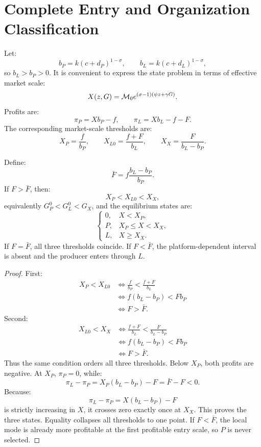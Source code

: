 \section{Complete Entry and Organization Classification}

Let:
\[
b_P=k(c+d_P)^{1-\sigma},
\qquad
b_L=k(c+d_L)^{1-\sigma},
\]
so \(b_L>b_P>0\).  It is convenient to express the state problem in terms of
effective market scale:
\[
X(z,G)=\mathcal M_0e^{(\sigma-1)(\psi z+\gamma G)}.
\]
Profits are:
\[
\pi_P=Xb_P-f,
\qquad
\pi_L=Xb_L-f-F.
\]
The corresponding market-scale thresholds are:
\[
X_P=\frac{f}{b_P},
\qquad
X_{L0}=\frac{f+F}{b_L},
\qquad
X_X=\frac{F}{b_L-b_P}.
\]

\begin{lemma}
\label{lem:three_region}
Define:
\[
\bar F=f\frac{b_L-b_P}{b_P}.
\]
If \(F>\bar F\), then:
\[
X_P<X_{L0}<X_X,
\]
equivalently \(G_P^0<G_L^0<G_X\), and the equilibrium states are:
\[
\begin{cases}
0,&X<X_P,\\
P,&X_P\leq X<X_X,\\
L,&X\geq X_X.
\end{cases}
\]
If \(F=\bar F\), all three thresholds coincide.  If \(F<\bar F\), the
platform-dependent interval is absent and the producer enters through \(L\).
\end{lemma}

\begin{proof}
First:
\begin{align*}
X_P<X_{L0}
&\Longleftrightarrow
\frac{f}{b_P}<\frac{f+F}{b_L}\\
&\Longleftrightarrow
f(b_L-b_P)<Fb_P\\
&\Longleftrightarrow F>\bar F.
\end{align*}
Second:
\begin{align*}
X_{L0}<X_X
&\Longleftrightarrow
\frac{f+F}{b_L}<\frac{F}{b_L-b_P}\\
&\Longleftrightarrow
f(b_L-b_P)<Fb_P\\
&\Longleftrightarrow F>\bar F.
\end{align*}
Thus the same condition orders all three thresholds.  Below \(X_P\), both
profits are negative.  At \(X_P\), \(\pi_P=0\), while:
\[
\pi_L-\pi_P
=X_P(b_L-b_P)-F
=\bar F-F<0.
\]
Because:
\[
\pi_L-\pi_P=X(b_L-b_P)-F
\]
is strictly increasing in \(X\), it crosses zero exactly once at \(X_X\).
This proves the three states.  Equality collapses all thresholds to one
point.  If \(F<\bar F\), the local mode is already more profitable at the
first profitable entry scale, so \(P\) is never selected.
\end{proof}

